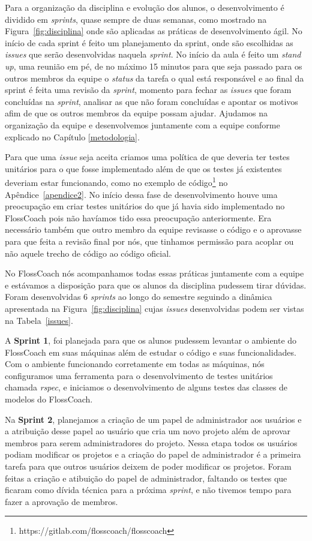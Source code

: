 Para a organização da disciplina e evolução dos alunos, o desenvolvimento é dividido
em \textit{sprints}, quase sempre de duas semanas, como mostrado na Figura~\ref{fig:disciplina}
onde são aplicadas as práticas de desenvolvimento ágil. No início de cada sprint é feito um planejamento da sprint, 
onde são escolhidas as \textit{issues} que serão desenvolvidas naquela \textit{sprint}.
No início da aula é feito um \textit{stand up}, uma reunião em pé, de no máximo 15
minutos para que seja passado para os outros membros da equipe o \textit{status} da
tarefa o qual está responsável e ao final da sprint é feita uma revisão da \textit{sprint},
momento para fechar as \textit{issues} que foram concluídas na \textit{sprint}, 
analisar as que não foram concluídas e apontar os motivos afim de que os outros membros
da equipe possam ajudar. Ajudamos na organização da equipe e desenvolvemos juntamente
com a equipe conforme explicado no Capítulo \ref{metodologia}.

Para que uma \textit{issue} seja aceita criamos uma política de que deveria ter
testes unitários para o que fosse implementado além de que os testes já existentes
deveriam estar funcionando, como no exemplo de código\footnote{https://gitlab.com/flosscoach/flosscoach} 
no Apêndice~\ref{apendice2}.
No início dessa fase de desenvolvimento houve uma preocupação 
em criar testes unitários do que já havia sido implementado no FlossCoach pois 
não havíamos tido essa preocupação anteriormente. Era necessário também que outro 
membro da equipe revisasse o código e o aprovasse para que feita a revisão final
por nós, que tinhamos permissão para acoplar ou não aquele trecho de código ao
código oficial. 

No FlossCoach nós acompanhamos todas essas práticas juntamente com a equipe e estávamos
a disposição para que os alunos da disciplina pudessem tirar dúvidas. Foram desenvolvidas
6 \textit{sprints} ao longo do semestre seguindo a dinâmica apresentada na Figura~\ref{fig:disciplina} 
cujas \textit{issues} desenvolvidas podem ser vistas na Tabela~\ref{issues}.

A \textbf{Sprint 1}, foi planejada para que os alunos pudessem levantar o ambiente
do FlossCoach em suas máquinas além de estudar o código e suas funcionalidades. Com o
ambiente funcionando corretamente em todas as máquinas, nós configuramos uma ferramenta
para o desenvolvimento de testes unitários chamada \textit{rspec}, e iniciamos o 
desenvolvimento de alguns testes das classes de modelos do FlossCoach. 

Na \textbf{Sprint 2}, planejamos a criação de um papel de administrador aos usuários
e a atribuição desse papel ao usuário que cria um novo projeto além de aprovar 
membros para serem administradores do projeto. Nessa etapa todos os usuários podiam
modificar os projetos e a criação do papel de administrador é a primeira tarefa 
para que outros usuários deixem de poder modificar os projetos. Foram feitas a 
criação e atibuição do papel de administrador, faltando os testes que
ficaram como dívida técnica para a próxima \textit{sprint}, e não tivemos tempo para fazer a 
aprovação de membros. 

